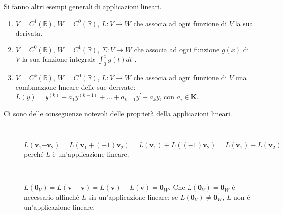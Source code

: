\documentclass{article}
\begin{document}
Si fanno altri esempi generali di applicazioni lineari.

\begin{enumerate}
\item $V=C^{1}\left( 
\mathbb{R}
\right) $, $W=C^{0}\left( 
\mathbb{R}
\right) $, $L:V\rightarrow W$ che associa ad ogni funzione di $V$ la sua
derivata.

\item $V=C^{0}\left( 
\mathbb{R}
\right) $, $W=C^{1}\left( 
\mathbb{R}
\right) $, $\Sigma :V\rightarrow W$ che associa ad ogni funzione $g\left(
x\right) $ di $V$ la sua funzione integrale $\int_{0}^{x}g\left( t\right) dt$%
.

\item $V=C^{k}\left( 
\mathbb{R}
\right) $, $W=C^{0}\left( 
\mathbb{R}
\right) $, $L:V\rightarrow W$ che associa ad ogni funzione di $V$ una
combinazione lineare delle sue derivate: $L\left( y\right) =y^{\left(
k\right) }+a_{1}y^{\left( k-1\right) }+...+a_{k-1}y^{\prime }+a_{k}y$, con $%
a_{i}\in \mathbf{K}$.
\end{enumerate}

Ci sono delle conseguenze notevoli delle propriet\`{a} della applicazioni
lineari.

\begin{description}
\item[-] $L\left( \mathbf{v}_{1}\mathbf{-v}_{2}\right) =L\left( \mathbf{v}%
_{1}+\left( -1\right) \mathbf{v}_{2}\right) =L\left( \mathbf{v}_{1}\right)
+L\left( \left( -1\right) \mathbf{v}_{2}\right) =L\left( \mathbf{v}%
_{1}\right) -L\left( \mathbf{v}_{2}\right) $ perch\'{e} $L$ \`{e}
un'applicazione lineare.

\item[-] $L\left( \mathbf{0}_{V}\right) =L\left( \mathbf{v-v}\right)
=L\left( \mathbf{v}\right) -L\left( \mathbf{v}\right) =\mathbf{0}_{W}$. Che $%
L\left( \mathbf{0}_{V}\right) =\mathbf{0}_{W}$ \`{e} necessario affinch\'{e} 
$L$ sia un'applicazione lineare: se $L\left( \mathbf{0}_{V}\right) \neq 
\mathbf{0}_{W}$, $L$ non \`{e} un'applicazione lineare.
\end{description}

\end{document}
